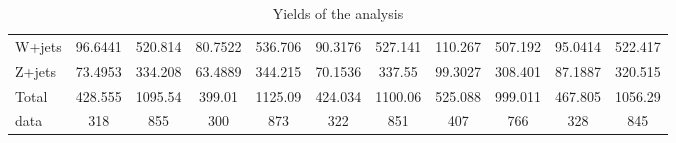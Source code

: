 \documentclass[10pt]{article}
\begin{document}
\begin{table}[htbp]
\begin{center}
\begin{tabular}{|l|S|S|S|S|S|S|S|S|S|S|}
  W+jets   & 96.6441  & 520.814  & 80.7522  & 536.706  & 90.3176  & 527.141  & 110.267  & 507.192  & 95.0414  & 522.417  \\ 
  Z+jets   & 73.4953  & 334.208  & 63.4889  & 344.215  & 70.1536  & 337.55  & 99.3027  & 308.401  & 87.1887  & 320.515  \\ 
\hline 
  Total  & 428.555  & 1095.54  & 399.01  & 1125.09  & 424.034  & 1100.06  & 525.088  & 999.011  & 467.805  & 1056.29  \\ 
\hline 
  data   & 318 & 855 & 300 & 873 & 322 & 851 & 407 & 766 & 328 & 845 \\ 
\hline 
\end{tabular} 
\caption{Yields of the analysis} 
\end{center} 
\end{table} 
\end{document}
